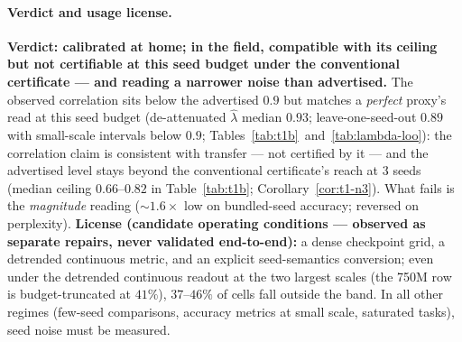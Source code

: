 \paragraph{Verdict and usage license.}
\label{sec:t1-license}
\textbf{Verdict: calibrated at home; in the field, compatible with its ceiling but
not certifiable at this seed budget under the conventional certificate --- and reading a narrower noise than advertised.} The observed correlation
sits below the advertised $0.9$ but matches a \emph{perfect} proxy's read at this seed budget
(de-attenuated $\hat\lambda$ median $0.93$; leave-one-seed-out $0.89$ with small-scale
intervals below $0.9$; Tables~\ref{tab:t1b}~and~\ref{tab:lambda-loo}): the correlation claim is
consistent with transfer --- not certified by it --- and the advertised level stays beyond the
conventional certificate's reach
at 3 seeds
(median ceiling $0.66$--$0.82$ in Table~\ref{tab:t1b}; Corollary~\ref{cor:t1-n3}). What fails is the \emph{magnitude} reading
(${\sim}1.6\times$ low on bundled-seed accuracy; reversed on perplexity). \textbf{License (candidate
operating conditions --- observed as separate repairs, never validated end-to-end):} a dense checkpoint grid, a
detrended continuous metric, and an explicit seed-semantics conversion; even under the detrended continuous readout at the two largest scales (the 750M row is budget-truncated at $41\%$), $37$--$46\%$ of cells fall outside the band. In all other regimes (few-seed comparisons,
accuracy metrics at small scale, saturated tasks), seed noise must be measured.

